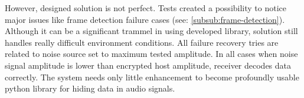 However, designed solution is not perfect. Tests created a possibility to notice major issues like frame detection failure
cases (see: \ref{subsub:frame-detection}). Although it can be a significant trammel in using developed library, solution
still handles really difficult environment conditions. All failure recovery tries are related to noise source set to maximum 
tested amplitude. In all cases when noise signal amplitude is lower than encrypted host amplitude, receiver decodes data correctly.
The system needs only little enhancement to become profoundly usable python library for hiding data in audio signals.
